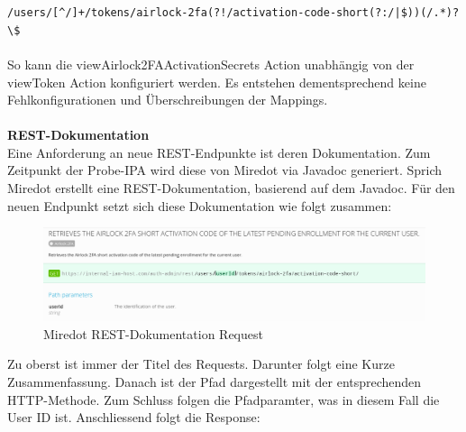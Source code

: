 \noindent \verb @/users/[^/]+/tokens/airlock-2fa(?!/activation-code-short(?:/|$))(/.*)?\$ @\\\\
So kann die viewAirlock2FAActivationSecrets Action unabhängig von der viewToken Action konfiguriert werden. Es entstehen dementsprechend keine Fehlkonfigurationen und Überschreibungen der Mappings.\\
\\
\textbf{REST-Dokumentation}\\
Eine Anforderung an neue REST-Endpunkte ist deren Dokumentation. Zum Zeitpunkt der Probe-IPA wird diese von Miredot via Javadoc generiert. Sprich Miredot erstellt eine REST-Dokumentation, basierend auf dem Javadoc. Für den neuen Endpunkt setzt sich diese Dokumentation wie folgt zusammen:
\begin{figure}[H]
	\begin{center}
		\includegraphics[width=1.0\textwidth]{ressourcen/requestdoc}
		\caption[REST-Dokumentation Request]{Miredot REST-Dokumentation Request}\label{fig:requestdoc}
	\end{center}
\end{figure}
\noindent Zu oberst ist immer der Titel des Requests. Darunter folgt eine Kurze Zusammenfassung. Danach ist der Pfad dargestellt mit der entsprechenden HTTP-Methode.
Zum Schluss folgen die Pfadparamter, was in diesem Fall die User ID ist.
Anschliessend folgt die Response:

